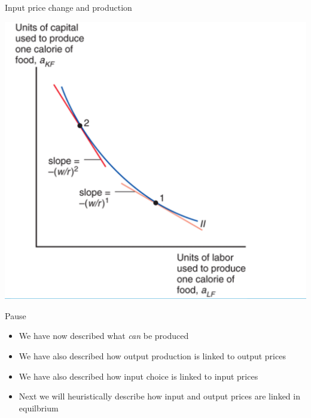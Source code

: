 \documentclass[ignorenonframetext,]{beamer}
\begin{document}
\begin{frame}{Input price change and production}

    \includegraphics[scale=0.25]{factor_price_change.png}

\end{frame}

\begin{frame}{Pause}

    \begin{itemize}
        \item We have now described what \emph{can} be produced
        \item We have also described how output production is linked to output prices
        \item We have also described how input choice is linked to input prices
        \item Next we will heuristically describe how input and output prices are linked in equilbrium
    \end{itemize}

\end{frame}
\end{document}
